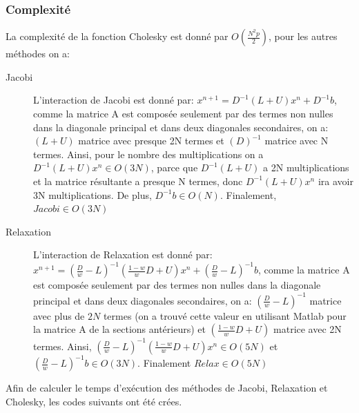 \documentclass[a4paper,11pt]{article}
\begin{document}
\subsubsection{Complexité}

La complexité de la fonction Cholesky est donné par $O(\frac{N^2p}{2})$, pour les autres
méthodes on a:

\begin{description}
\item[Jacobi]{L'interaction  de Jacobi est donné  par: $x^{n+1}=D^{-1}(L+U)x^n +
  D^{-1}b$,  comme la  matrice  A   est composée seulement par  des termes  non  nulles dans  la
  diagonale principal et dans deux diagonales secondaires, on a: $(L+U)$ matrice
  avec presque  2N termes et  $(D)^{-1}$ matrice avec  N termes. Ainsi,  pour le
  nombre  des  multiplications  on  a  $D^{-1}(L+U)x^n  \in  O(3N)$,  parce  que
  $D^{-1}(L+U)$  a 2N  multiplications  et  la matrice  résultante  a presque  N
  termes, donc $D^{-1}(L+U)x^n$ ira avoir 3N multiplications. De plus, $D^{-1}b
  \in O(N)$}. Finalement, $Jacobi \in O(3N)$
 
\item[Relaxation]{ L'interaction  de Relaxation est donné  par: $x^{n+1}=(\frac{D}{w}-L)^{-1}(\frac{1-w}{w}D+U)x^n +
  (\frac{D}{w}-L)^{-1}b$, comme la matrice A est composée seulement par des termes non nulles dans la
  diagonale   principal   et   dans   deux   diagonales   secondaires,   on   a:
  $(\frac{D}{w}-L)^{-1} $ matrice avec plus de $2N$ termes (on a trouvé cette valeur en
  utilisant Matlab pour la matrice A de la sections antérieurs)
         et $(\frac{1-w}{w}D+U)$ matrice avec 2N termes. Ainsi,
  $(\frac{D}{w}-L)^{-1}(\frac{1-w}{w}D+U)x^n         \in        O(5N)$        et
  $(\frac{D}{w}-L)^{-1}b \in O(3N)$. Finalement $Relax \in O(5N)$
}
\end{description}

Afin de calculer le temps d'exécution des méthodes de Jacobi, Relaxation et
Cholesky, les codes suivants ont été crées.


\begin{multicols}{2}
  
\end{multicols}

\begin{multicols}{2}
  
\end{multicols}


\begin{multicols}{2}
  
\end{multicols}
\end{document}
